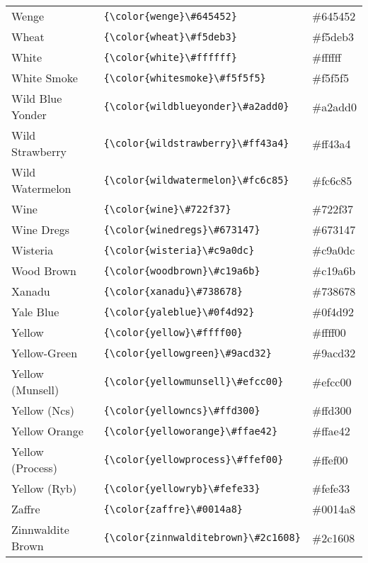 \documentclass[9.5pt]{article}
\begin{document}
\begin{longtable}{l | l | l}
	Wenge & \verb!{\color{wenge}\#645452}! & {\color{wenge}\#645452}\\
	Wheat & \verb!{\color{wheat}\#f5deb3}! & {\color{wheat}\#f5deb3}\\
	White & \verb!{\color{white}\#ffffff}! & {\color{white}\#ffffff}\\
	White Smoke & \verb!{\color{whitesmoke}\#f5f5f5}! & {\color{whitesmoke}\#f5f5f5}\\
	Wild Blue Yonder & \verb!{\color{wildblueyonder}\#a2add0}! & {\color{wildblueyonder}\#a2add0}\\
	Wild Strawberry & \verb!{\color{wildstrawberry}\#ff43a4}! & {\color{wildstrawberry}\#ff43a4}\\
	Wild Watermelon & \verb!{\color{wildwatermelon}\#fc6c85}! & {\color{wildwatermelon}\#fc6c85}\\
	Wine & \verb!{\color{wine}\#722f37}! & {\color{wine}\#722f37}\\
	Wine Dregs & \verb!{\color{winedregs}\#673147}! & {\color{winedregs}\#673147}\\
	Wisteria & \verb!{\color{wisteria}\#c9a0dc}! & {\color{wisteria}\#c9a0dc}\\
	Wood Brown & \verb!{\color{woodbrown}\#c19a6b}! & {\color{woodbrown}\#c19a6b}\\
	Xanadu & \verb!{\color{xanadu}\#738678}! & {\color{xanadu}\#738678}\\
	Yale Blue & \verb!{\color{yaleblue}\#0f4d92}! & {\color{yaleblue}\#0f4d92}\\
	Yellow & \verb!{\color{yellow}\#ffff00}! & {\color{yellow}\#ffff00}\\
	Yellow-Green & \verb!{\color{yellowgreen}\#9acd32}! & {\color{yellowgreen}\#9acd32}\\
	Yellow (Munsell) & \verb!{\color{yellowmunsell}\#efcc00}! & {\color{yellowmunsell}\#efcc00}\\
	Yellow (Ncs) & \verb!{\color{yellowncs}\#ffd300}! & {\color{yellowncs}\#ffd300}\\
	Yellow Orange & \verb!{\color{yelloworange}\#ffae42}! & {\color{yelloworange}\#ffae42}\\
	Yellow (Process) & \verb!{\color{yellowprocess}\#ffef00}! & {\color{yellowprocess}\#ffef00}\\
	Yellow (Ryb) & \verb!{\color{yellowryb}\#fefe33}! & {\color{yellowryb}\#fefe33}\\
	Zaffre & \verb!{\color{zaffre}\#0014a8}! & {\color{zaffre}\#0014a8}\\
	Zinnwaldite Brown & \verb!{\color{zinnwalditebrown}\#2c1608}! & {\color{zinnwalditebrown}\#2c1608}
\end{longtable}
\end{document}
